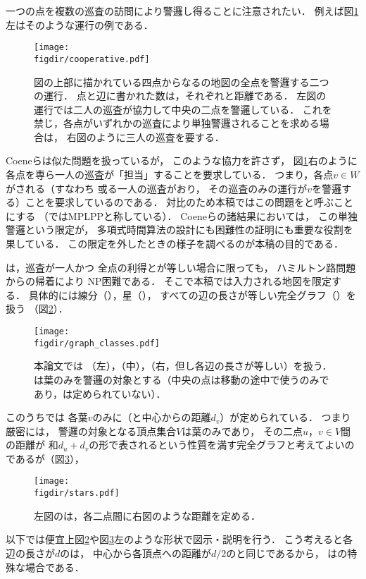 一つの点を複数の巡査の訪問により警邏し得ることに注意されたい．
例えば図\ref{figure: cooperative}左はそのような運行の例である．
\begin{figure}
  \centering
  \texttt{[image: \\figdir/cooperative.pdf]}
  \caption{図の上部に描かれている四点からなる{\graphLine}の地図の全点を警邏する二つの運行．
    点と辺に書かれた数は，それぞれ{\maxIdletime}と距離である．
    左図の運行では二人の巡査が協力して中央の二点を警邏している．
    これを禁じ，各点がいずれかの巡査により単独警邏されることを求める場合は，
    右図のように三人の巡査を要する．}
  \label{figure: cooperative}
\end{figure}
Coeneら\cite{coene2011charlemagne}は似た問題を扱っているが，
このような協力を許さず，
図\ref{figure: cooperative}右のように
各点を専ら一人の巡査が「担当」することを要求している．
つまり，各点$v \in W$がされる（すなわち
或る一人の巡査がおり，
その巡査のみの運行が$v$を警邏する）ことを要求しているのである．
対比のため本稿ではこの問題を{\independentPatProb}と呼ぶことにする
（\cite{coene2011charlemagne}ではMPLPPと称している）．
Coeneら\cite{coene2011charlemagne}の諸結果においては，
この単独警邏という限定が，
多項式時間算法の設計にも困難性の証明にも重要な役割を果している．
この限定を外したときの様子を調べるのが本稿の目的である．

{\patProb}は，巡査が一人かつ
全点の利得と{\maxIdletime}が等しい場合に限っても，
ハミルトン路問題からの帰着により
NP困難である\cite[Theorem~8]{coene2011charlemagne}．
そこで本稿では入力される地図を限定する．
具体的には線分（{\graphLine}），星（{\graphStar}），
すべての辺の長さが等しい完全グラフ（{\graphUnit}）を扱う
（図\ref{figure: graph_classes}）．
\begin{figure}
  \centering
  \texttt{[image: \\figdir/graph\_classes.pdf]}
  \caption{本論文では
    {\graphLine}（左），{\graphStar}（中），{\graphUnit}（右，但し各辺の長さが等しい）を扱う．
    {\graphStar}は葉のみを警邏の対象とする（中央の点は移動の途中で使うのみであり，{\maxIdletime}は定められていない）．}
  \label{figure: graph_classes}
\end{figure}
このうち{\graphStar}では
各葉$v$のみに{\maxIdletime}（と中心からの距離$d _v$）が定められている．
つまり厳密には，
警邏の対象となる頂点集合$V$は葉のみであり，
その二点$u$，$v \in V$間の距離が
和$d _u + d _v$の形で表されるという性質を満す完全グラフと考えてよいのであるが（図\ref{figure: stars}），
\begin{figure}
  \centering
  \texttt{[image: \\figdir/stars.pdf]}
  \caption{左図の{\graphStar}は，各二点間に右図のような距離を定める．}
  \label{figure: stars}
\end{figure}
以下では便宜上図\ref{figure: graph_classes}や図\ref{figure: stars}左のような形状で図示・説明を行う．
こう考えると各辺の長さが$d$の{\graphUnit}は，
中心から各頂点への距離が$d/2$の{\graphStar}と同じであるから，
{\graphUnit}は{\graphStar}の特殊な場合である．

